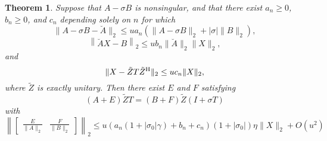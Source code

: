 \documentclass[12pt]{article}
\def\H{{\rm H}}
\newtheorem{theorem}{Theorem}
\begin{document}
\begin{theorem}
  \label{th:deflating_subspaces}
  Suppose that $A-\sigma B$ is nonsingular, and that there exist
  $a_n\geq 0$, $b_n\geq 0$, and $c_n$ depending solely on $n$ for which
  \begin{equation*}
    \|A-\sigma B - \breve{A}\|_2 \leq u a_n (\|A-\sigma B\|_2 + |\sigma| \|B\|_2),
  \end{equation*}
  \begin{equation}
    \label{eq:Xerror}
    \left\| \breve{A} X - B \right\|_2 
    \leq u b_n \|\breve{A}\|_2 \|X\|_2,
  \end{equation}
  and
  \begin{equation}
    \label{eq:schur_error}
    \| X - \tilde{Z} T \tilde{Z}^\H \|_2 \leq u c_n \|X\|_2,
  \end{equation}
  where $\tilde{Z}$ is exactly unitary.  Then there exist $E$ and $F$
  satisfying
  \begin{equation*}
    (A+E)\tilde{Z} T = (B+F)\tilde{Z}(I+\sigma T)
  \end{equation*}
  with
  \begin{equation*}
    \left\|
      \begin{bmatrix}
        \frac{E}{\|A\|_2} & \frac{F}{\|B\|_2}
      \end{bmatrix}
    \right\|_2 \leq 
    u (a_n(1+|\sigma_0|\gamma) + b_n + c_n)(1+|\sigma_0|) \eta\|X\|_2 +O(u^2)
  \end{equation*}
\end{theorem}
\end{document}
